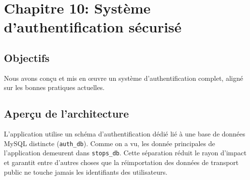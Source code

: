 \chapter{Chapitre 10: Système d'authentification sécurisé}\label{chap:auth}

\section{Objectifs}
Nous avons conçu et mis en œuvre un système d'authentification complet, aligné sur les bonnes pratiques actuelles.

\section{Aperçu de l'architecture}
L'application utilise un schéma d'authentification dédié lié à une base de données MySQL distincte (\texttt{auth\_db}). Comme on a vu, les donnée principales de l'application demeurent dans \texttt{stops\_db}. Cette séparation réduit le rayon d'impact et garantit entre d'autres choses que la réimportation des données de transport public ne touche jamais les identifiants des utilisateurs.

